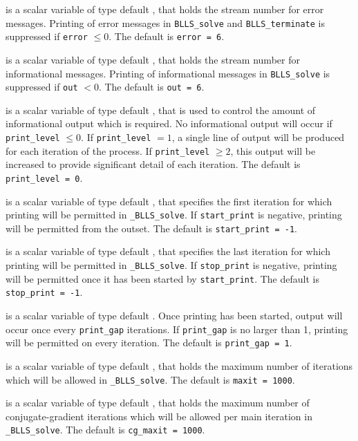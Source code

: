 \documentclass{galahad}
\newcommand{\packagename}{BLLS}
\newcommand{\fullpackagename}{\libraryname\_\packagename}
\newcommand{\solver}{{\tt \fullpackagename\_solve}}
\begin{document}
\begin{description}

 is a scalar variable of type default \integer, that holds the
stream number for error messages. Printing of error messages in
{\tt \packagename\_solve} and {\tt \packagename\_terminate}
is suppressed if {\tt error} $\leq 0$.
The default is {\tt error = 6}.

 is a scalar variable of type default \integer, that holds the
stream number for informational messages. Printing of informational messages in
{\tt \packagename\_solve} is suppressed if {\tt out} $< 0$.
The default is {\tt out = 6}.

 is a scalar variable of type default \integer, that is used
to control the amount of informational output which is required. No
informational output will occur if {\tt print\_level} $\leq 0$. If
{\tt print\_level} $= 1$, a single line of output will be produced for each
iteration of the process. If {\tt print\_level} $\geq 2$, this output will be
increased to provide significant detail of each iteration.
The default is {\tt print\_level = 0}.

 is a scalar variable of type default \integer, that specifies
the first iteration for which printing will be permitted in \solver.
If {\tt start\_print} is negative, printing will be permitted from the outset.
The default is {\tt start\_print = -1}.

 is a scalar variable of type default \integer, that specifies
the last iteration for which printing will be permitted in  \solver.
If {\tt stop\_print} is negative, printing will be permitted once it has been
started by {\tt start\_print}.
The default is {\tt stop\_print = -1}.

 is a scalar variable of type default \integer.
Once printing has been started, output will occur once every
{\tt print\_gap} iterations. If {\tt print\_gap} is no larger than 1,
printing will be permitted on every iteration.
The default is {\tt print\_gap = 1}.

 is a scalar variable of type default \integer, that holds the
maximum number of iterations which will be allowed in \solver.
The default is {\tt maxit = 1000}.

 is a scalar variable of type default \integer, that holds the
maximum number of conjugate-gradient iterations which will be allowed
per main iteration in \solver.
The default is {\tt cg\_maxit = 1000}.


\end{description}
\end{document}
